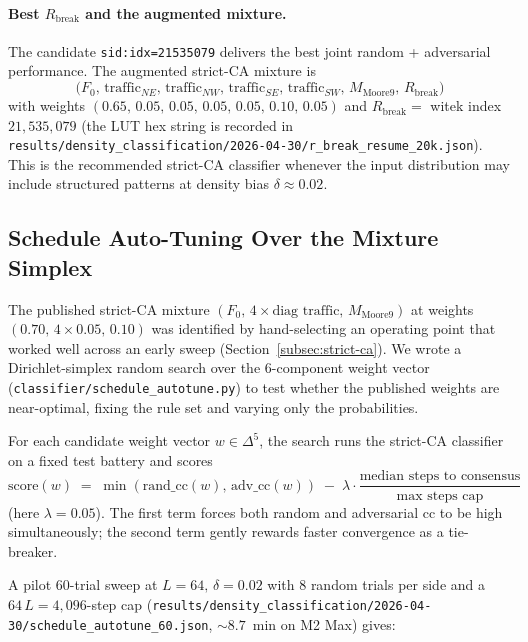 \documentclass[11pt,a4paper]{article}
\newcommand{\sid}[1]{\texttt{sid:}\allowbreak\texttt{#1}}
\newcommand{\fpath}[1]{\nolinkurl{#1}}
\begin{document}
\paragraph{Best \(R_{\mathrm{break}}\) and the augmented mixture.}
The candidate \sid{idx=21535079} delivers the best joint random +
adversarial performance.  The augmented strict-CA mixture is
\[
\bigl(F_0,\,\mathrm{traffic}_{NE},\,\mathrm{traffic}_{NW},\,
       \mathrm{traffic}_{SE},\,\mathrm{traffic}_{SW},\,M_{\mathrm{Moore9}},\,
       R_{\mathrm{break}}\bigr)
\]
with weights
\((0.65,\,0.05,\,0.05,\,0.05,\,0.05,\,0.10,\,0.05)\)
and \(R_{\mathrm{break}} = \) witek index \(21{,}535{,}079\) (the LUT
hex string is recorded in
\fpath{results/density_classification/2026-04-30/r_break_resume_20k.json}).
This is the recommended strict-CA classifier whenever the input
distribution may include structured patterns at density bias
\(\delta \approx 0.02\).

\subsection{Schedule Auto-Tuning Over the Mixture Simplex}
\label{subsec:schedule-autotune}

The published strict-CA mixture
\((F_0,\,4{\times}\text{diag traffic},\,M_{\mathrm{Moore9}})\) at weights
\((0.70,\,4{\times}0.05,\,0.10)\) was identified by hand-selecting an
operating point that worked well across an early sweep
(Section~\ref{subsec:strict-ca}).  We wrote a Dirichlet-simplex random
search over the 6-component weight vector
(\fpath{classifier/schedule_autotune.py}) to test whether the
published weights are near-optimal, fixing the rule set and varying
only the probabilities.

For each candidate weight vector \(w \in \Delta^5\), the search runs
the strict-CA classifier on a fixed test battery and scores
\[
\mathrm{score}(w)
\;=\;
\min(\mathrm{rand\_cc}(w),\,\mathrm{adv\_cc}(w))
\;-\;
\lambda \cdot \frac{\text{median steps to consensus}}{\text{max steps cap}}
\]
(here \(\lambda = 0.05\)).  The first term forces both random and
adversarial cc to be high simultaneously; the second term gently
rewards faster convergence as a tie-breaker.

A pilot 60-trial sweep at \(L=64,\,\delta=0.02\) with \(8\) random
trials per side and a \(64\,L = 4{,}096\)-step cap
(\fpath{results/density_classification/2026-04-30/schedule_autotune_60.json},
\(\sim 8.7\)~min on M2 Max) gives:
\end{document}
